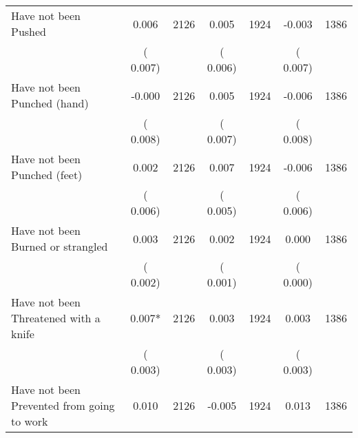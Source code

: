 \begin{tabular}{l*{6}{c}}
Have not been Pushed        &              0.006      &       2126       &              0.005      &       1924       &             -0.003      &       1386       \\
                       &       (       0.007)            &                               &       (       0.006)            &                               &       (       0.007)            &                               \\
Have not been Punched (hand)        &             -0.000      &       2126       &              0.005      &       1924       &             -0.006      &       1386       \\
                       &       (       0.008)            &                               &       (       0.007)            &                               &       (       0.008)            &                               \\
Have not been Punched (feet)        &              0.002      &       2126       &              0.007      &       1924       &             -0.006      &       1386       \\
                       &       (       0.006)            &                               &       (       0.005)            &                               &       (       0.006)            &                               \\
Have not been Burned or strangled        &              0.003      &       2126       &              0.002      &       1924       &              0.000      &       1386       \\
                       &       (       0.002)            &                               &       (       0.001)            &                               &       (       0.000)            &                               \\
Have not been Threatened with a knife        &              0.007*      &       2126       &              0.003      &       1924       &              0.003      &       1386       \\
                       &       (       0.003)            &                               &       (       0.003)            &                               &       (       0.003)            &                               \\
Have not been Prevented from going to work        &              0.010      &       2126       &             -0.005      &       1924       &              0.013      &       1386       \\

\end{tabular}
